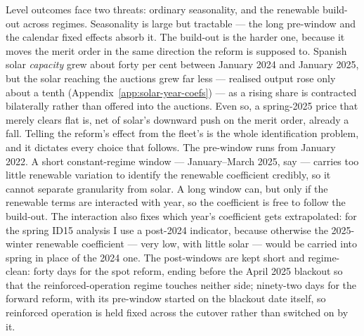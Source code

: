 \documentclass[11pt,a4paper]{article}
\theoremstyle{definition}
\theoremstyle{remark}
\theoremstyle{plain}
\begin{document}
Level outcomes face two threats: ordinary seasonality, and the renewable build-out across regimes. Seasonality is large but tractable --- the long pre-window and the calendar fixed effects absorb it. The build-out is the harder one, because it moves the merit order in the same direction the reform is supposed to.
Spanish solar \emph{capacity} grew about forty per cent between January 2024 and January 2025, but the solar reaching the auctions grew far less --- realised output rose only about a tenth (Appendix~\ref{app:solar-year-coefs}) --- as a rising share is contracted bilaterally rather than offered into the auctions. Even so, a spring-2025 price that merely clears flat is, net of solar's downward push on the merit order, already a fall. Telling the reform's effect from the fleet's is the whole identification problem, and it dictates every choice that follows.
The pre-window runs from January 2022. A short constant-regime window --- January--March 2025, say --- carries too little renewable variation to identify the renewable coefficient credibly, so it cannot separate granularity from solar. A long window can, but only if the renewable terms are interacted with year, so the coefficient is free to follow the build-out. The interaction also fixes which year's coefficient gets extrapolated: for the spring ID15 analysis I use a post-2024 indicator, because otherwise the 2025-winter renewable coefficient --- very low, with little solar --- would be carried into spring in place of the 2024 one. 
The post-windows are kept short and regime-clean: forty days for the spot reform, ending before the April 2025 blackout so that the reinforced-operation regime touches neither side; ninety-two days for the forward reform, with its pre-window started on the blackout date itself, so reinforced operation is held fixed across the cutover rather than switched on by it.
\end{document}
